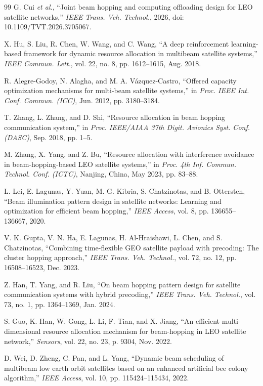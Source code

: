 \documentclass[journal]{IEEEtran}
\begin{document}
\begin{thebibliography}{99}
 G. Cui \textit{et al.}, ``Joint beam hopping and computing offloading design for LEO satellite networks,'' \textit{IEEE Trans. Veh. Technol.}, 2026, doi: 10.1109/TVT.2026.3705067.

 X. Hu, S. Liu, R. Chen, W. Wang, and C. Wang, ``A deep reinforcement learning-based framework for dynamic resource allocation in multibeam satellite systems,'' \textit{IEEE Commun. Lett.}, vol. 22, no. 8, pp. 1612--1615, Aug. 2018.

 R. Alegre-Godoy, N. Alagha, and M. A. V\'azquez-Castro, ``Offered capacity optimization mechanisms for multi-beam satellite systems,'' in \textit{Proc. IEEE Int. Conf. Commun. (ICC)}, Jun. 2012, pp. 3180--3184.

 T. Zhang, L. Zhang, and D. Shi, ``Resource allocation in beam hopping communication system,'' in \textit{Proc. IEEE/AIAA 37th Digit. Avionics Syst. Conf. (DASC)}, Sep. 2018, pp. 1--5.

 M. Zhang, X. Yang, and Z. Bu, ``Resource allocation with interference avoidance in beam-hopping-based LEO satellite systems,'' in \textit{Proc. 4th Inf. Commun. Technol. Conf. (ICTC)}, Nanjing, China, May 2023, pp. 83--88.

 L. Lei, E. Lagunas, Y. Yuan, M. G. Kibria, S. Chatzinotas, and B. Ottersten, ``Beam illumination pattern design in satellite networks: Learning and optimization for efficient beam hopping,'' \textit{IEEE Access}, vol. 8, pp. 136655--136667, 2020.

 V. K. Gupta, V. N. Ha, E. Lagunas, H. Al-Hraishawi, L. Chen, and S. Chatzinotas, ``Combining time-flexible GEO satellite payload with precoding: The cluster hopping approach,'' \textit{IEEE Trans. Veh. Technol.}, vol. 72, no. 12, pp. 16508--16523, Dec. 2023.

 Z. Han, T. Yang, and R. Liu, ``On beam hopping pattern design for satellite communication systems with hybrid precoding,'' \textit{IEEE Trans. Veh. Technol.}, vol. 73, no. 1, pp. 1364--1369, Jan. 2024.

 S. Guo, K. Han, W. Gong, L. Li, F. Tian, and X. Jiang, ``An efficient multi-dimensional resource allocation mechanism for beam-hopping in LEO satellite network,'' \textit{Sensors}, vol. 22, no. 23, p. 9304, Nov. 2022.

 D. Wei, D. Zheng, C. Pan, and L. Yang, ``Dynamic beam scheduling of multibeam low earth orbit satellites based on an enhanced artificial bee colony algorithm,'' \textit{IEEE Access}, vol. 10, pp. 115424--115434, 2022.


\end{thebibliography}
\end{document}
